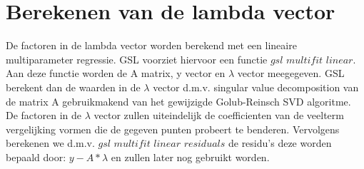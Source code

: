 \documentclass[10pt,a4paper]{article}
\begin{document}
\section{Berekenen van de lambda vector}
De factoren in de lambda vector worden berekend met een lineaire multiparameter regressie. GSL voorziet hiervoor een functie $\textit{gsl multifit linear}$. Aan deze functie worden de A matrix, y vector en $\lambda$ vector meegegeven. GSL berekent dan de waarden in de $\lambda$ vector d.m.v. singular value decomposition van de matrix A  gebruikmakend  van het gewijzigde Golub-Reinsch SVD algoritme.
\newline
\newline
De factoren in de $\lambda$ vector zullen uiteindelijk de coefficienten van de veelterm vergelijking vormen die de gegeven punten probeert te benderen.
\newline
\newline
Vervolgens berekenen we d.m.v. $\textit{gsl multifit linear residuals}$ de residu's deze worden bepaald door: $y - A * \lambda$ en zullen later nog gebruikt worden.
\end{document}
